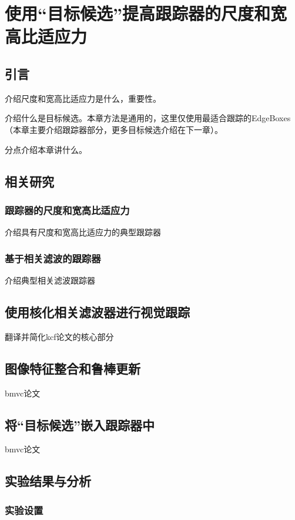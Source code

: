 \chapter{使用``目标候选''提高跟踪器的尺度和宽高比适应力}
\label{chapbmvc}

\section{引言}
介绍尺度和宽高比适应力是什么，重要性。

介绍什么是目标候选。本章方法是通用的，这里仅使用最适合跟踪的EdgeBoxes（本章主要介绍跟踪器部分，更多目标候选介绍在下一章）。

分点介绍本章讲什么。

\section{相关研究}
\subsection{跟踪器的尺度和宽高比适应力}
介绍具有尺度和宽高比适应力的典型跟踪器
\subsection{基于相关滤波的跟踪器}
介绍典型相关滤波跟踪器

\section{使用核化相关滤波器进行视觉跟踪}
翻译并简化kcf论文的核心部分

\section{图像特征整合和鲁棒更新}
bmvc论文

\section{将``目标候选''嵌入跟踪器中}
bmvc论文

\section{实验结果与分析}
\subsection{实验设置}

